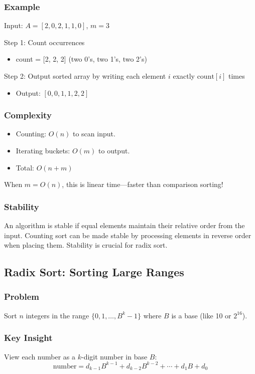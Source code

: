 \documentclass[11pt]{article}
\begin{document}
\subsubsection*{Example}
Input: $A = [2, 0, 2, 1, 1, 0]$, $m = 3$

Step 1: Count occurrences
\begin{itemize}
\item count = [2, 2, 2] (two 0's, two 1's, two 2's)
\end{itemize}

Step 2: Output sorted array by writing each element $i$ exactly $\text{count}[i]$ times
\begin{itemize}
\item Output: $[0, 0, 1, 1, 2, 2]$
\end{itemize}

\subsubsection*{Complexity}
\begin{itemize}
\item Counting: $O(n)$ to scan input.
\item Iterating buckets: $O(m)$ to output.
\item Total: $O(n + m)$
\end{itemize}

When $m = O(n)$, this is linear time—faster than comparison sorting!

\subsubsection*{Stability}
An algorithm is stable if equal elements maintain their relative order from the input. Counting sort can be made stable by processing elements in reverse order when placing them. Stability is crucial for radix sort.

\subsection*{Radix Sort: Sorting Large Ranges}

\subsubsection*{Problem}
Sort $n$ integers in the range $\{0, 1, \ldots, B^k - 1\}$ where $B$ is a base (like 10 or $2^{16}$).

\subsubsection*{Key Insight}
View each number as a $k$-digit number in base $B$:
\[
\text{number} = d_{k-1} B^{k-1} + d_{k-2} B^{k-2} + \cdots + d_1 B + d_0
\]
\end{document}
